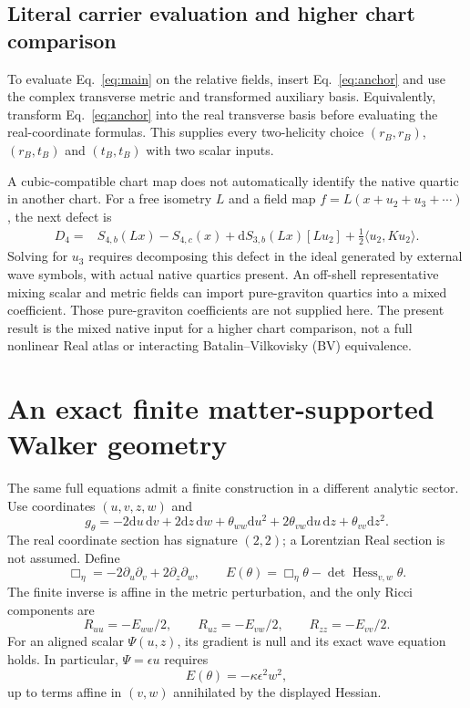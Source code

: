 \documentclass[11pt]{article}
\newcommand{\Hess}{\operatorname{Hess}}
\newcommand{\dd}{\mathrm d}
\begin{document}
\subsection{Literal carrier evaluation and higher chart comparison}

To evaluate Eq.~\eqref{eq:main} on the relative fields, insert Eq.~\eqref{eq:anchor} and use the complex transverse metric and transformed auxiliary basis.
Equivalently, transform Eq.~\eqref{eq:anchor} into the real transverse basis before evaluating the real-coordinate formulas.
This supplies every two-helicity choice \((r_B,r_B)\), \((r_B,t_B)\) and \((t_B,t_B)\) with two scalar inputs.

A cubic-compatible chart map does not automatically identify the native quartic in another chart.
For a free isometry \(L\) and a field map \(f=L(x+u_2+u_3+\cdots)\), the next defect is
\begin{align}
 D_4={}&S_{4,b}(Lx)-S_{4,c}(x)
 +\dd S_{3,b}(Lx)[Lu_2]
 +\frac12\langle u_2,Ku_2\rangle.
 \label{eq:quartic-defect}
\end{align}
Solving for \(u_3\) requires decomposing this defect in the ideal generated by external wave symbols, with actual native quartics present.
An off-shell representative mixing scalar and metric fields can import pure-graviton quartics into a mixed coefficient.
Those pure-graviton coefficients are not supplied here.
The present result is the mixed native input for a higher chart comparison, not a full nonlinear Real atlas or interacting Batalin--Vilkovisky (BV) equivalence.

\section{An exact finite matter-supported Walker geometry}
\label{sec:finite}

The same full equations admit a finite construction in a different analytic sector.
Use coordinates \((u,v,z,w)\) and
\begin{equation}
 g_\theta=-2\dd u\,\dd v+2\dd z\,\dd w
 +\theta_{ww}\dd u^2+2\theta_{vw}\dd u\,\dd z+\theta_{vv}\dd z^2.
 \label{eq:walker}
\end{equation}
The real coordinate section has signature \((2,2)\); a Lorentzian Real section is not assumed.
Define
\begin{equation}
 \Box_\eta=-2\partial_u\partial_v+2\partial_z\partial_w,
 \qquad E(\theta)=\Box_\eta\theta-\det\Hess_{v,w}\theta.
 \label{eq:heavenly}
\end{equation}
The finite inverse is affine in the metric perturbation, and the only Ricci components are
\begin{equation}
 R_{uu}=-E_{ww}/2,\qquad R_{uz}=-E_{vw}/2,\qquad R_{zz}=-E_{vv}/2.
 \label{eq:walker-ricci}
\end{equation}
For an aligned scalar \(\Psi(u,z)\), its gradient is null and its exact wave equation holds.
In particular, \(\Psi=\epsilon u\) requires
\begin{equation}
 E(\theta)=-\kappa\epsilon^2w^2,
 \label{eq:sourced-E}
\end{equation}
up to terms affine in \((v,w)\) annihilated by the displayed Hessian.
\end{document}
